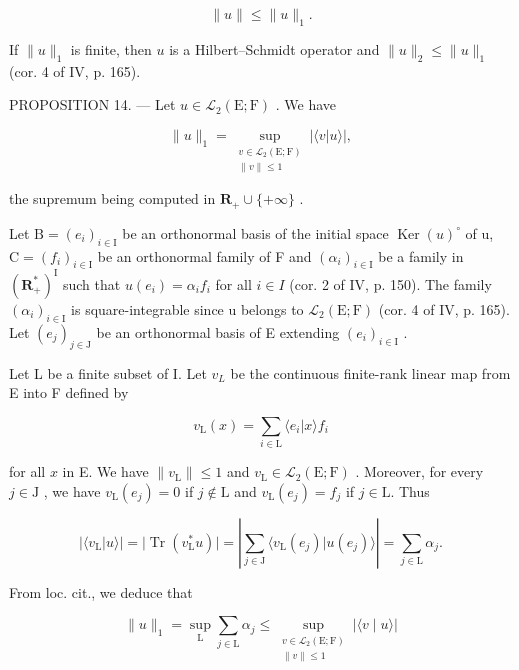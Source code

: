 \[
\| u \| \leqslant \| u \| _ {1}.\tag{9}
\]

If \(\| u\| _1\) is finite, then \(u\) is a Hilbert--Schmidt operator and \(\| u\| _2 \leqslant \| u\| _1\) (cor. 4 of IV, p. 165).

PROPOSITION 14. --- Let \(u \in \mathcal{L}_2(\mathrm{E};\mathrm{F})\) . We have

\[
\| u\|_{1} = \sup_{\substack{v\in \mathcal{L}_{2}(\mathrm{E};\mathrm{F})\\ \| v\| \leqslant 1}}|\langle v  |  u\rangle |,
\]

the supremum being computed in \(\mathbf{R}_{+} \cup \{+\infty\}\) .

Let \(\mathrm{B} = (e_i)_{i \in \mathrm{I}}\) be an orthonormal basis of the initial space \(\operatorname{Ker}(u)^{\circ}\) of u, \(\mathrm{C} = (f_i)_{i \in \mathrm{I}}\) be an orthonormal family of F and \((\alpha_i)_{i \in \mathrm{I}}\) be a family in \((\mathbf{R}_+^*)^{\mathrm{I}}\) such that \(u(e_i) = \alpha_i f_i\) for all \(i \in I\) (cor. 2 of IV, p. 150). The family \((\alpha_i)_{i \in \mathrm{I}}\) is square-integrable since u belongs to \(\mathcal{L}_2(\mathrm{E};\mathrm{F})\) (cor. 4 of IV, p. 165). Let \((e_j)_{j \in \mathrm{J}}\) be an orthonormal basis of E extending \((e_i)_{i \in \mathrm{I}}\) .

Let L be a finite subset of I. Let \(v_{L}\) be the continuous finite-rank linear map from E into F defined by

\[
v _ {\mathrm{L}} (x) = \sum_ {i \in \mathrm{L}} \langle e _ {i} | x \rangle f _ {i}
\]

for all \(x\) in E. We have \(\| v_{\mathrm{L}}\| \leqslant 1\) and \(v_{\mathrm{L}}\in \mathcal{L}_{2}(\mathrm{E};\mathrm{F})\) . Moreover, for every \(j\in \mathrm{J}\) , we have \(v_{\mathrm{L}}(e_j) = 0\) if \(j\notin \mathrm{L}\) and \(v_{\mathrm{L}}(e_j) = f_j\) if \(j\in \mathrm{L}\). Thus

\[
| \langle v _ {\mathrm{L}} | u \rangle | = | \operatorname{Tr} (v _ {\mathrm{L}} ^ {*} u) | = \left| \sum_ {j \in \mathrm{J}} \langle v _ {\mathrm{L}} (e _ {j}) | u (e _ {j}) \rangle \right| = \sum_ {j \in \mathrm{L}} \alpha_ {j}.
\]

From loc. cit., we deduce that

\[
\| u\|_{1} = \sup_{\text{L}}\sum_{j\in \text{L}}\alpha_{j}\leqslant \sup_{\substack{v\in \mathcal{L}_{2}(\text{E};\text{F})\\ \| v\| \leqslant 1}}|\langle v\mid u\rangle |\tag{10}
\]

